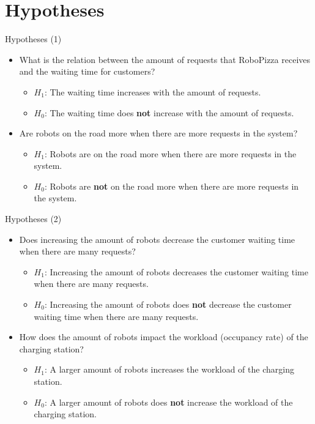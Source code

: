 \section{Hypotheses}

\begin{frame}{Hypotheses (1)}
    \begin{itemize}
        \setlength\itemsep{1.5em}

        \item What is the relation between the amount of requests that RoboPizza receives and the waiting time for customers?
            \begin{itemize}
                \item $H_1$: The waiting time increases with the amount of requests.
                \item $H_0$: The waiting time does \textbf{not} increase with the amount of requests.
            \end{itemize}

        \item Are robots on the road more when there are more requests in the system?
            \begin{itemize}
                \item $H_1$: Robots are on the road more when there are more requests in the system.
                \item $H_0$: Robots are \textbf{not} on the road more when there are more requests in the system.
            \end{itemize}
    \end{itemize}
\end{frame}

\begin{frame}{Hypotheses (2)}
    \begin{itemize}
        \setlength\itemsep{1.5em}

        \item Does increasing the amount of robots decrease the customer waiting time when there are many requests?
            \begin{itemize}
                \item $H_1$: Increasing the amount of robots decreases the customer waiting time when there are many requests.
                \item $H_0$: Increasing the amount of robots does \textbf{not} decrease the customer waiting time when there are many requests.
            \end{itemize}

        \item How does the amount of robots impact the workload (occupancy rate) of the charging station?
            \begin{itemize}
                \item $H_1$: A larger amount of robots increases the workload of the charging station.
                \item $H_0$: A larger amount of robots does \textbf{not} increase the workload of the charging station.
            \end{itemize}
    \end{itemize}
\end{frame}

